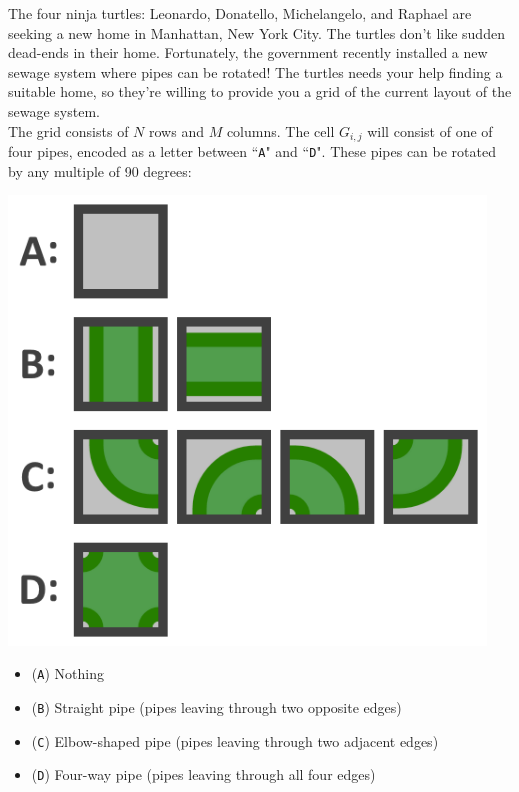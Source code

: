 
\noindent The four ninja turtles: Leonardo, Donatello, Michelangelo, and Raphael are seeking a new home in Manhattan, New York City. The turtles don't like sudden dead-ends in their home. Fortunately, the government recently installed a new sewage system where pipes can be rotated! The turtles needs your help finding a suitable home, so they're willing to provide you a grid of the current layout of the sewage system.\\

The grid consists of $N$ rows and $M$ columns. The cell $G_{i,j}$ will consist of one of four pipes, encoded as a letter between ``\texttt{A}" and ``\texttt{D}". These pipes can be rotated by any multiple of 90 degrees:\\

\noindent
\begin{minipage}{0.25\textwidth}
  \includegraphics[width=0.95\textwidth]{pipe_rotation_1.png}
\end{minipage}
\begin{minipage}{0.75\textwidth}
  \begin{itemize}
    \item (\texttt{A}) Nothing
    \item (\texttt{B}) Straight pipe (pipes leaving through two opposite edges)
    \item (\texttt{C}) Elbow-shaped pipe (pipes leaving through two adjacent edges)
    \item (\texttt{D}) Four-way pipe (pipes leaving through all four edges)
  \end{itemize}
\end{minipage}
\vspace{10pt}

